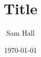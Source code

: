 \documentclass[10pt,t,serif]{beamer}
\title{Title}
\author[S.~Hall]{Sam Hall}
\institute[I.C.L.]{Imperial College London}
\date{\today}
\begin{document}
\begin{frame}[c]
\titlepage
\end{frame}

%
\end{document}
